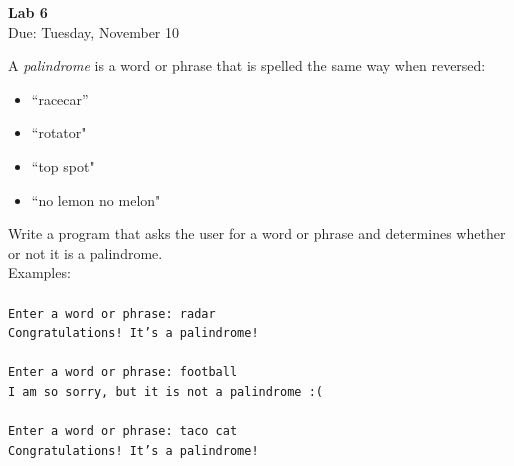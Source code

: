 \documentclass{article}
\begin{document}
\fancyfoot[C]{\thepage}
\vspace*{0cm}
\begin{center}
	{\LARGE \textbf{Lab 6}}\\
	\vspace{0.25cm}
	{\Large Due: Tuesday, November 10}
\end{center}

A \textit{palindrome} is a word or phrase that is spelled the same way when reversed:
\begin{itemize}
	\item ``racecar''
	\item ``rotator"
	\item ``top spot"
	\item ``no lemon no melon"
\end{itemize}
Write a program that asks the user for a word or phrase and determines whether or not it is a palindrome.
\\
Examples:
\\\\
\texttt{Enter a word or phrase: radar}\\
\texttt{Congratulations! It's a palindrome!}
\\\\
\texttt{Enter a word or phrase: football}\\
\texttt{I am so sorry, but it is not a palindrome :( }
\\\\
\texttt{Enter a word or phrase: taco cat}\\
\texttt{Congratulations! It's a palindrome!}
\end{document}
